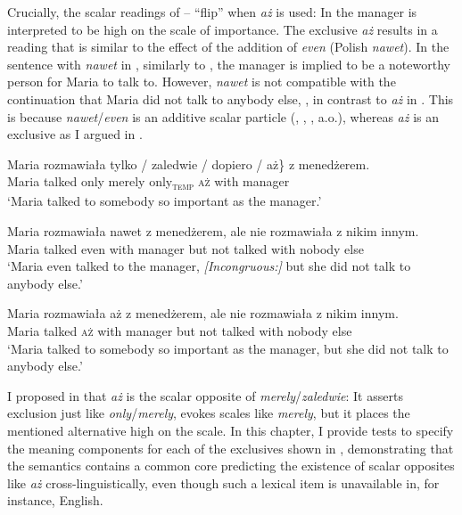 \documentclass[output=paper,colorlinks,citecolor=brown]{langscibook}
\begin{document}
\noindent Crucially, the scalar readings of -- “flip” when \textit{aż}  is used: In  the manager is interpreted to be high on the scale of importance. The exclusive \textit{aż} results in a reading that is similar to the effect of the addition of \textit{even} (Polish \textit{nawet}). In the sentence with \textit{nawet} in , similarly to , the manager is implied to be a noteworthy person for Maria to talk to. However, \textit{nawet} is not compatible with the continuation that Maria did not talk to anybody else, , in contrast to \textit{aż} in . This is because \textit{nawet}/\textit{even} is an additive scalar particle (\citealt{horn69}, \citealt{karttunenpeters79}, \citealt{rooth85,rooth92}, a.o.), whereas \textit{aż} is an exclusive as I argued in \citet{tomaszewicz12,tomaszewicz13,tomaszewicz13a}.

\ea\label{ex:tom:13}
\gll Maria   rozmawiała   \minsp{\{\#} tylko / \minsp{\#} zaledwie / \minsp{\#} dopiero / aż\}   z       menedżerem.\\
Maria talked {} only {} {} merely {} {} only\textsubscript{\textsc{temp}} {} \textsc{aż} with  manager\\
\glt ‘Maria talked to somebody so important as the manager.’
\z 

\ea\label{ex:tom:14}
\gll Maria rozmawiała nawet z menedżerem, \minsp{\#} ale nie rozmawiała z nikim innym.\\
Maria talked even with  manager {} but not talked with nobody else\\
\glt `Maria even talked to the manager, \textit{[Incongruous:]} but she did not talk to anybody else.’
\z 

\ea\label{ex:tom:15}
\gll Maria rozmawiała aż z menedżerem, ale nie rozmawiała z nikim innym. \\
Maria talked \textsc{aż} with  manager but not talked with  nobody else\\
\glt `Maria talked to somebody so important as the manager, but she did not talk to anybody else.’
\z 


\noindent I proposed in \citet{tomaszewicz12,tomaszewicz13,tomaszewicz13a} that \textit{aż} is the scalar opposite of \textit{merely}/\textit{zaledwie}: It asserts exclusion just like \textit{only}/\textit{merely}, evokes scales like \textit{merely}, but it places the mentioned alternative high on the scale. In this chapter, I provide tests to specify the meaning components for each of the exclusives shown in , demonstrating that the semantics contains a common core predicting the existence of scalar opposites like \textit{aż} cross-linguistically, even though such a lexical item is unavailable in, for instance, English.
\end{document}
